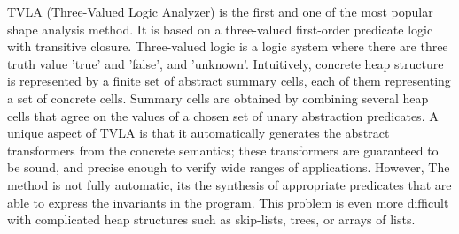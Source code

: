 
 
TVLA (Three-Valued Logic Analyzer) \cite{SagivRW02} is the first and one of the most popular shape analysis
method. It is based on a three-valued first-order predicate logic with transitive closure. Three-valued logic is a logic system where there are three truth value ’true’ and ’false’, and ’unknown’. Intuitively, concrete heap structure is represented by a finite set of abstract summary cells, each of them representing a set of concrete cells. Summary cells are obtained by combining several heap cells that agree on the values of a chosen set of unary abstraction predicates. A unique aspect of TVLA is that it automatically generates the abstract transformers from the concrete semantics; these transformers are guaranteed to be sound, and precise enough to verify wide ranges of applications. However,
The method is not fully automatic, its the synthesis of appropriate predicates that are able to express the invariants in the program. This problem is even more difficult with complicated heap structures such as skip-lists, trees, or arrays of lists.  

